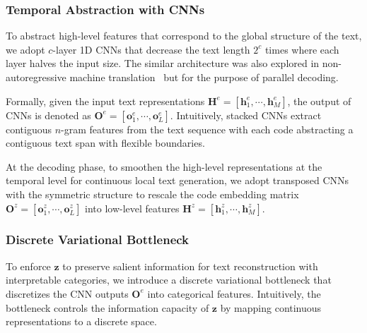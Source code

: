\documentclass[11pt]{article}
\begin{document}
\subsubsection{Temporal Abstraction with CNNs}\label{sec:cnn}

To abstract high-level features that correspond to the global structure of the text, we adopt $c$-layer 1D CNNs that decrease the text length $2^c$ times where each layer halves the input size. The similar architecture was also explored in non-autoregressive machine translation~\citep{DBLP:conf/icml/KaiserBRVPUS18} but for the purpose of parallel decoding.

Formally, given the input text representations $\boldsymbol{H}^e=[\boldsymbol{h}_1^e,\cdots,\boldsymbol{h}_M^e]$, the output of CNNs is denoted as $\boldsymbol{O}^e=[\boldsymbol{o}_1^e,\cdots,\boldsymbol{o}_L^e]$. Intuitively, stacked CNNs extract contiguous $n$-gram features from the text sequence with each code abstracting a contiguous text span with flexible boundaries.

At the decoding phase, to smoothen the high-level representations at the temporal level for continuous local text generation, we adopt transposed CNNs with the symmetric structure to rescale the code embedding matrix $\boldsymbol{O}^z=[\boldsymbol{o}_1^z,\cdots,\boldsymbol{o}_L^z]$ into low-level features $\boldsymbol{H}^z=[\boldsymbol{h}_1^z,\cdots,\boldsymbol{h}_M^z]$.


\subsubsection{Discrete Variational Bottleneck}\label{sec:bottleneck}

To enforce $\boldsymbol{z}$ to preserve salient information for text reconstruction with interpretable categories, we introduce a discrete variational bottleneck that discretizes the 
CNN outputs %
$\boldsymbol{O}^e$ into categorical features. Intuitively, the bottleneck controls the information capacity of $\boldsymbol{z}$ by mapping continuous representations to a discrete space.
\end{document}
